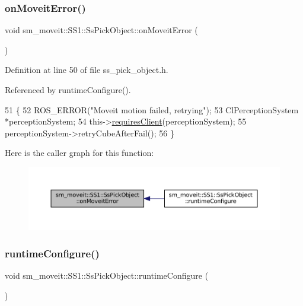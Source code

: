 \subsubsection{\texorpdfstring{on\+Moveit\+Error()}{onMoveitError()}}
{\footnotesize\ttfamily void sm\+\_\+moveit\+::\+S\+S1\+::\+Ss\+Pick\+Object\+::on\+Moveit\+Error (\begin{DoxyParamCaption}{ }\end{DoxyParamCaption})\hspace{0.3cm}{\ttfamily [inline]}}



Definition at line 50 of file ss\+\_\+pick\+\_\+object.\+h.



Referenced by runtime\+Configure().


\begin{DoxyCode}
51     \{
52         ROS\_ERROR(\textcolor{stringliteral}{"Moveit motion failed, retrying"});
53         ClPerceptionSystem *perceptionSystem;
54         this->\hyperlink{classsmacc_1_1ISmaccState_a7f95c9f0a6ea2d6f18d1aec0519de4ac}{requiresClient}(perceptionSystem);
55         perceptionSystem->retryCubeAfterFail();
56     \}
\end{DoxyCode}
Here is the caller graph for this function\+:
\nopagebreak
\begin{figure}[H]
\begin{center}
\leavevmode
\includegraphics[width=350pt]{structsm__moveit_1_1SS1_1_1SsPickObject_aa5ad4c6436b70a13b27a45936876374c_icgraph}
\end{center}
\end{figure}
\mbox{\label{structsm__moveit_1_1SS1_1_1SsPickObject_acb8cbbad6e452a98ff2ccf93a6bdd1a4}} 
\subsubsection{\texorpdfstring{runtime\+Configure()}{runtimeConfigure()}}
{\footnotesize\ttfamily void sm\+\_\+moveit\+::\+S\+S1\+::\+Ss\+Pick\+Object\+::runtime\+Configure (\begin{DoxyParamCaption}{ }\end{DoxyParamCaption})\hspace{0.3cm}{\ttfamily [inline]}}



